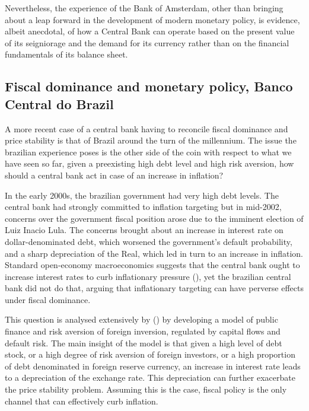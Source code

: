 \documentclass[american]{scrartcl}
\newcommand{\citein}[1]{\citeauthor{#1} (\citeyear{#1})}
\begin{document}
Nevertheless, the experience of the Bank of Amsterdam, other than bringing about a leap forward in the development of modern monetary policy, is evidence, albeit anecdotal, of how a Central Bank can operate based on the present value of its seigniorage and the demand for its currency rather than on the financial fundamentals of its balance sheet.


\subsection{Fiscal dominance and monetary policy, Banco Central do Brazil}

A more recent case of a central bank having to reconcile fiscal dominance and price stability is that of Brazil around the turn of the millennium. The issue the brazilian experience poses is the other side of the coin with respect to what we have seen so far, given a preexisting high debt level and high risk aversion, how should a central bank act in case of an increase in inflation?

In the early 2000s, the brazilian government had very high debt levels. The central bank had strongly committed to inflation targeting but in mid-2002, concerns over the government fiscal position arose due to the imminent election of Luiz Inacio Lula. The concerns brought about an increase in interest rate on dollar-denominated debt, which worsened the government's default probability, and a sharp depreciation of the Real, which led in turn to an increase in inflation. Standard open-economy macroeconomics suggests that the central bank ought to increase interest rates to curb inflationary pressure (\cite[p. 3]{Blanchard2004}), yet the brazilian central bank did not do that, arguing that inflationary targeting can have perverse effects under fiscal dominance.

This question is analysed extensively by \citein{Blanchard2004} by developing a model of public finance and risk aversion of foreign inversion, regulated by capital flows and default risk. The main insight of the model is that given a high level of debt stock, or a high degree of risk aversion of foreign investors, or a high proportion of debt denominated in foreign reserve currency, an increase in interest rate leads to a depreciation of the exchange rate. This depreciation can further exacerbate the price stability problem. Assuming this is the case, fiscal policy is the only channel that can effectively curb inflation.
\end{document}
